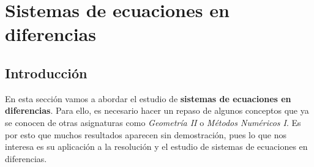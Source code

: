 \newpage





\section{Sistemas de ecuaciones en diferencias}

\subsection{Introducción}

En esta sección vamos a abordar el estudio de \textbf{sistemas de ecuaciones en diferencias}. Para ello, es necesario hacer un repaso de algunos conceptos que ya se conocen de otras asignaturas como \textit{Geometría II} o \textit{Métodos
  Numéricos I}. Es por esto que muchos resultados aparecen sin demostración, pues lo que nos interesa es su aplicación a la resolución y el estudio de sistemas de ecuaciones en diferencias.

